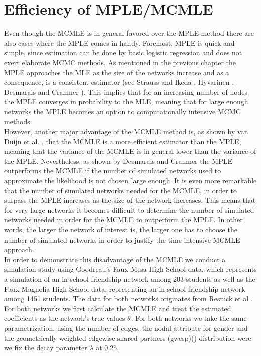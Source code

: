 \documentclass[headsepline=true, abstracton]{scrartcl}
\begin{document}
\section*{Efficiency of MPLE/MCMLE}
Even though the MCMLE is in general favored over the MPLE method there are also cases where the MPLE comes in handy. Foremost, MPLE is quick and simple, since estimation can be done by basic logistic regression and does not exert elaborate MCMC methods. As mentioned in the previous chapter the MPLE approaches the MLE as the size of the networks increase and as a consequence, is a consistent estimator (see Strauss and Ikeda \cite{StraussIkeda1990}, Hyvarinen \cite{Hyvarinen2006}, Desmarais and Cranmer \cite{Desmarais.2012}). This implies that for an increasing number of nodes the MPLE converges in probability to the MLE, meaning that for large enough networks the MPLE becomes an option to computationally intensive MCMC methods.\\
However, another major advantage of the MCMLE method is, as shown by van Duijn et al. \cite{vanDuijnetal2009}, that the MCMLE is a more efficient estimator than the MPLE, meaning that the variance of the MCMLE is in general lower than the variance of the MPLE. Nevertheless, as shown by Desmarais and Cranmer \cite{Desmarais.2012} the MPLE outperforms the MCMLE if the number of simulated networks used to approximate the likelihood is not chosen large enough. It is even more remarkable that the number of simulated networks needed for the MCMLE, in order to surpass the MPLE increases as the size of the network increases. This means that for very large networks it becomes difficult to determine the number of simulated networks needed in order for the MCMLE to outperform the MPLE. In other words, the larger the network of interest is, the larger one has to choose the number of simulated networks in order to justify the time intensive MCMLE approach.\\[0.3cm]
\noindent In order to demonstrate this disadvantage of the MCMLE we conduct a simulation study using Goodreau's Faux Mesa High School data, which represents a simulation of an in-school friendship network among 203 students as well as the Faux Magnolia High School data, representing an in-school friendship network among 1451 students. The data for both networks originates from Resnick et al \cite{Resnicketal1997}.\\[0.3cm]
For both networks we first calculate the MCMLE and treat the estimated coefficients as the network's true values $\theta$. For both networks we take the same parametrization, using the number of edges, the nodal attribute for gender and the geometrically weighted edgewise shared partners (gwesp)(\cite{Hunter.2006}) distribution were we fix the decay parameter $\lambda$ at $0.25$.\\
\end{document}
